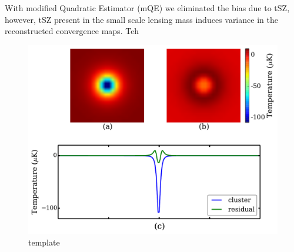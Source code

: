   With modified Quadratic Estimator (mQE) we eliminated the bias due to tSZ, however, tSZ present in the small scale lensing mass induces variance in the reconstructed convergence maps.
 Teh
  \begin{figure}[H]
\includegraphics[width=\linewidth]{figs/template_fitting.pdf}
\caption{template}
\label{fig:gradient_cut}
\end{figure}
